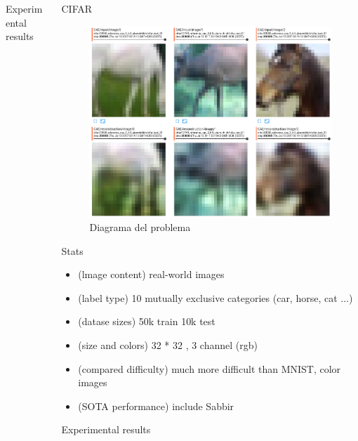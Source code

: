 \documentclass[final]{beamer}
\newlength{\onecolwid}
\begin{document}
\begin{frame}[t]
\begin{columns}[t]
\begin{column}{\onecolwid}
\begin{block}{Experimental results}
\end{block}


\end{column} %



\begin{column}{\onecolwid} 

\begin{block}{CIFAR}

\end{block}

\begin{figure}
\includegraphics[width=0.8\linewidth]{graphics/cifar_reconstructions.png}
\caption{Diagrama del problema}
\end{figure}

\begin{block}{Stats}
\begin{itemize}
\item (lmage content) real-world images
\item (label type) 10 mutually exclusive categories (car, horse, cat ...)
\item (datase sizes) 50k train 10k test
\item (size and colors) 32 * 32 , 3 channel (rgb)
\item (compared difficulty) much more difficult than MNIST, color images
\item (SOTA performance) include Sabbir
\end{itemize}
\end{block}


\begin{block}{Experimental results}


\end{block}
\end{column}
\end{columns}
\end{frame}
\end{document}
